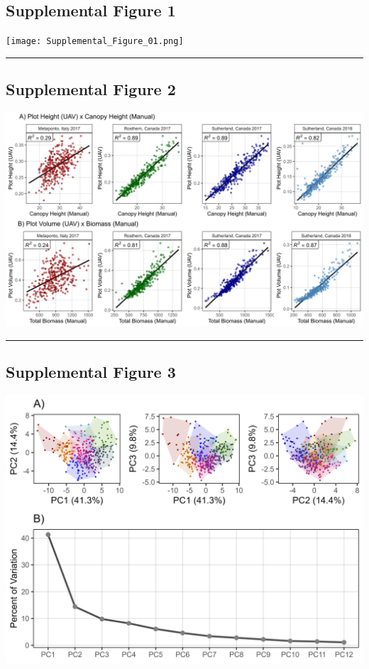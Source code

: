 \documentclass[
]{article}
\begin{document}
\subsection{Supplemental Figure 1}\label{supplemental-figure-1}

\texttt{[image: Supplemental\_Figure\_01.png]}

\begin{center}\rule{0.5\linewidth}{0.5pt}\end{center}

\subsection{Supplemental Figure 2}\label{supplemental-figure-2}

\includegraphics{Supplemental_Figure_02.png}

\begin{center}\rule{0.5\linewidth}{0.5pt}\end{center}

\subsection{Supplemental Figure 3}\label{supplemental-figure-3}

\includegraphics{Supplemental_Figure_03.png}
\end{document}
